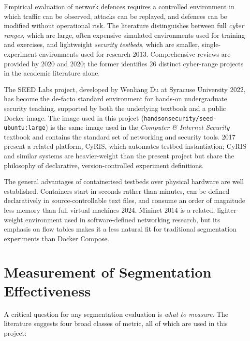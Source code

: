 Empirical evaluation of network defences requires a controlled environment in which traffic can be observed, attacks can be replayed, and defences can be modified without operational risk. The literature distinguishes between full \emph{cyber ranges}, which are large, often expensive simulated environments used for training and exercises, and lightweight \emph{security testbeds}, which are smaller, single-experiment environments used for research \parencite{Davis and Magrath}{2013}. Comprehensive reviews are provided by \textcite{Yamin, Katt and Gkioulos}{2020} and \textcite{Russo, Costa and Armando}{2020}; the former identifies 26 distinct cyber-range projects in the academic literature alone.

The SEED Labs project, developed by Wenliang Du at Syracuse University \parencite{Du}{2022}, has become the de-facto standard environment for hands-on undergraduate security teaching, supported by both the underlying textbook and a public Docker image. The image used in this project (\texttt{handsonsecurity/seed-ubuntu:large}) is the same image used in the \emph{Computer \& Internet Security} textbook and contains the standard set of networking and security tools. \textcite{Beuran et al.}{2017} present a related platform, CyRIS, which automates testbed instantiation; CyRIS and similar systems are heavier-weight than the present project but share the philosophy of declarative, version-controlled experiment definitions.

The general advantages of containerised testbeds over physical hardware are well established. Containers start in seconds rather than minutes, can be defined declaratively in source-controllable text files, and consume an order of magnitude less memory than full virtual machines \parencite{Docker Inc.}{2024}. Mininet \parencite{Kaur, Singh and Ghumman}{2014} is a related, lighter-weight environment used in software-defined networking research, but its emphasis on flow tables makes it a less natural fit for traditional segmentation experiments than Docker Compose.

\section{Measurement of Segmentation Effectiveness}

A critical question for any segmentation evaluation is \emph{what to measure}. The literature suggests four broad classes of metric, all of which are used in this project:

